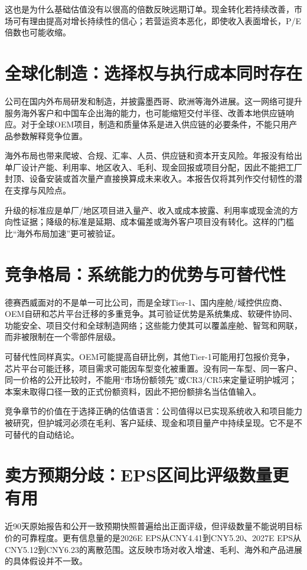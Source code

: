 这也是为什么基础估值没有以很高的倍数反映远期订单。现金转化若持续改善，市场可有理由提高对增长持续性的信心；若营运资本恶化，即使收入表面增长，P/E倍数也可能收缩。

\section{全球化制造：选择权与执行成本同时存在}

公司在国内外布局研发和制造，并披露墨西哥、欧洲等海外进展。这一网络可提升服务海外客户和中国车企出海的能力，也可能缩短交付半径、改善本地供应链响应。对于全球OEM项目，制造和质量体系是进入供应链的必要条件，不能只用产品参数解释竞争位置。

海外布局也带来爬坡、合规、汇率、人员、供应链和资本开支风险。年报没有给出单厂设计产能、利用率、地区收入、毛利、现金回报或项目分配，因此不能把工厂封顶、设备安装或首次量产直接换算成未来收入。本报告仅将其列作交付韧性的潜在支撑与风险点。

升级的标准应是单厂/地区项目进入量产、收入或成本披露、利用率或现金流的方向性证据；降级的标准是延期、成本偏差或海外客户项目没有转化。这样的门槛比“海外布局加速”更可被验证。

\section{竞争格局：系统能力的优势与可替代性}

德赛西威面对的不是单一可比公司，而是全球Tier-1、国内座舱/域控供应商、OEM自研和芯片平台迁移的多重竞争。其可验证优势是系统集成、软硬件协同、功能安全、项目交付和全球制造网络；这些能力使其可以覆盖座舱、智驾和网联，而非被限制在一个零部件层级。

可替代性同样真实。OEM可能提高自研比例，其他Tier-1可能用打包报价竞争，芯片平台可能迁移，项目需求可能因车型变化被重置。没有同一车型、同一客户、同一价格的公开比较时，不能用“市场份额领先”或CR3/CR5来定量证明护城河；本案未取得口径一致的正式份额资料，因此不把份额排名当估值输入。

竞争章节的价值在于选择正确的估值语言：公司值得以已实现系统收入和项目能力被研究，但护城河必须在毛利、客户延续、现金和项目量产中持续呈现。它不是不可替代的自动结论。

\section{卖方预期分歧：EPS区间比评级数量更有用}

近90天原始报告和公开一致预期快照普遍给出正面评级，但评级数量不能说明目标价的可靠程度。更有信息量的是2026E EPS从CNY4.41到CNY5.20、2027E EPS从CNY5.12到CNY6.23的离散范围。这反映市场对收入增速、毛利、海外和产品进展的具体假设并不一致。

